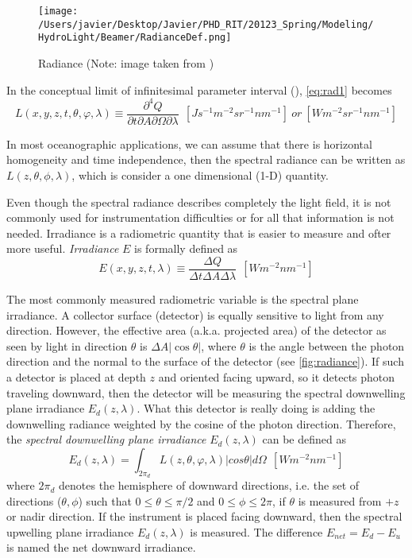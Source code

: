 \begin{figure}[htb]
  \centering
  \texttt{[image: /Users/javier/Desktop/Javier/PHD\_RIT/20123\_Spring/Modeling/HydroLight/Beamer/RadianceDef.png]}
\caption{Radiance (Note: image taken from \cite{Mobley:2001})}
\label{fig:radiance} 
\end{figure}

In the conceptual limit of infinitesimal parameter interval (\cite{Mobley:2001}), \autoref{eq:rad1} becomes
\begin{equation}
  L(x,y,z,t,\theta,\varphi,\lambda)\equiv\frac{\partial^4 Q}{\partial t\partial A\partial\Omega\partial\lambda}~~\left[ Js^{-1}m^{-2}sr^{-1}nm^{-1} \right]~or~\left[ W m^{-2}sr^{-1}nm^{-1} \right]
\end{equation}

In most oceanographic applications, we can assume that there is horizontal homogeneity and time independence, then the spectral radiance can be written as $L(z,\theta,\phi,\lambda)$, which is consider a one dimensional (1-D) quantity.

Even though the spectral radiance describes completely the light field, it is not commonly used for instrumentation difficulties or for all that information is not needed. Irradiance is a radiometric quantity that is easier to measure and ofter more useful. {\it Irradiance} $E$ is formally defined as
\begin{equation}
  E(x,y,z,t,\lambda) \equiv \frac{\Delta Q}{\Delta t\Delta A\Delta\lambda}~~\left[ W m^{-2}nm^{-1} \right]
\end{equation}

The most commonly measured radiometric variable is the spectral plane irradiance. A collector surface (detector) is equally sensitive to light from any direction. However, the effective area (a.k.a. projected area) of the detector as seen by light in direction $\theta$ is $\Delta A|\cos{\theta}|$, where $\theta$ is the angle between the photon direction and the normal to the surface of the detector (see \autoref{fig:radiance}). If such a detector is placed at depth $z$ and oriented facing upward, so it detects photon traveling downward, then the detector will be measuring the spectral downwelling plane irradiance $E_d(z,\lambda)$. What this detector is really doing is adding the downwelling radiance weighted by the cosine of the photon direction. Therefore, the {\it spectral downwelling plane irradiance} $E_d(z,\lambda)$ can be defined as
\begin{equation}
  E_{d}(z,\lambda)=\int_{2\pi_d} L(z,\theta,\varphi,\lambda)|cos\theta|d\Omega~~\left[Wm^{-2}nm^{-1} \right]
\end{equation}
where $2\pi_d$ denotes the hemisphere of downward directions, i.e. the set of directions ($\theta,\phi$) such that $0\leq\theta\leq\pi/2$ and $0\leq\phi\leq2\pi$, if $\theta$ is measured from $+z$ or nadir direction. If the instrument is placed facing downward, then the spectral upwelling plane irradiance $E_d(z,\lambda)$ is measured. The difference $E_{net}=E_d-E_u$ is named the net downward irradiance.

